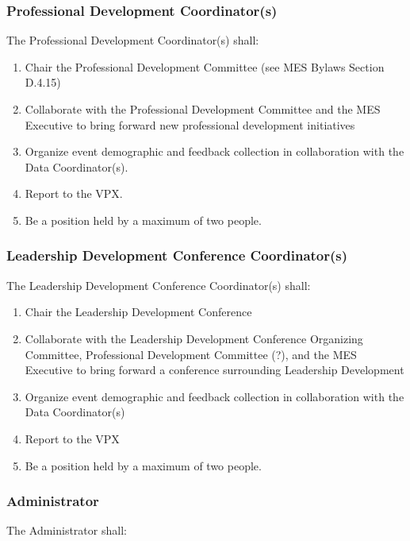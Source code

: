 \hypertarget{professional-development-coordinators}{%
 \subsubsection{Professional Development
  Coordinator(s)}
 \label{professional-development-coordinators}}
The Professional Development Coordinator(s) shall:

\begin{enumerate}
 \item
  Chair the Professional Development Committee (see MES Bylaws Section
  D.4.15)
 \item
  Collaborate with the Professional Development Committee and the MES
  Executive to bring forward new professional development initiatives
 \item
  Organize event demographic and feedback collection in collaboration
  with the Data Coordinator(s).
 \item
  Report to the VPX.
 \item
  Be a position held by a maximum of two people.

\end{enumerate}

\hypertarget{leadership-development-conference-coordinators}{%
 \subsubsection{Leadership Development Conference Coordinator(s)}
 \label{leadership-development-conference-coordinators}}
The Leadership Development Conference Coordinator(s) shall:

\begin{enumerate}
 \item
  Chair the Leadership Development Conference
 \item
  Collaborate with the Leadership Development Conference Organizing
  Committee, Professional Development Committee (?), and the MES
  Executive to bring forward a conference surrounding Leadership
  Development
 \item
  Organize event demographic and feedback collection in collaboration
  with the Data Coordinator(s)
 \item
  Report to the VPX
 \item
  Be a position held by a maximum of two people.
\end{enumerate}

\hypertarget{administrator}{%
 \subsubsection{Administrator}
 \label{administrator}}
The Administrator shall:

